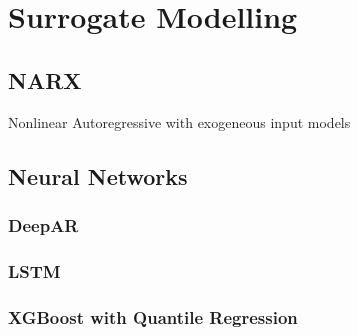 \chapter{Surrogate Modelling}

\section{NARX}
Nonlinear Autoregressive with exogeneous input models 

\section{Neural Networks}

\subsection{DeepAR}

\subsection{LSTM}

\subsection{XGBoost with Quantile Regression}